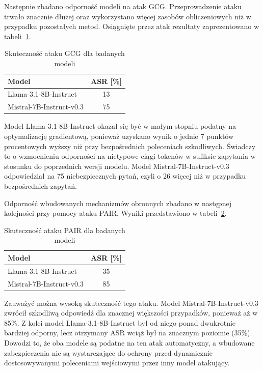 Następnie zbadano odporność modeli na atak \gls{GCG}. Przeprowadzenie ataku trwało znacznie dłużej oraz wykorzystano więcej zasobów obliczeniowych niż w przypadku pozostałych metod. Osiągnięte przez atak rezultaty zaprezentowano w tabeli~\ref{tab:gcg_tab}.
\begin{table}[!ht]
    \centering
    \renewcommand{\arraystretch}{1.2}
    \begin{tabular}{l|c}
        \hline
        \textbf{Model}           & \textbf{ASR [\%]} \\\hline
        Llama-3.1-8B-Instruct    & 13                \\\hline
        Mistral-7B-Instruct-v0.3 & 75                \\\hline
    \end{tabular}
    \caption{\label{tab:gcg_tab}Skuteczność ataku GCG dla badanych modeli}
\end{table}
Model Llama-3.1-8B-Instruct okazał się być w małym stopniu podatny na optymalizację gradientową, ponieważ uzyskano wynik o jednie 7 punktów procentowych wyższy niż przy bezpośrednich poleceniach szkodliwych. Świadczy to o wzmocnieniu odporności na nietypowe ciągi tokenów w sufiksie zapytania w stosunku do poprzednich wersji modelu. Model Mistral-7B-Instruct-v0.3 odpowiedział na 75 niebezpiecznych pytań, czyli o 26 więcej niż w przypadku bezpośrednich zapytań.

Odporność wbudowanych mechanizmów obronnych zbadano w następnej kolejności przy pomocy ataku \gls{PAIR}. Wyniki przedstawiono w tabeli~\ref{tab:pair_tab}.
\begin{table}[!ht]
    \centering
    \renewcommand{\arraystretch}{1.2}
    \begin{tabular}{l|c}
        \hline
        \textbf{Model}           & \textbf{ASR [\%]} \\\hline
        Llama-3.1-8B-Instruct    & 35                \\\hline
        Mistral-7B-Instruct-v0.3 & 85                \\\hline
    \end{tabular}
    \caption{\label{tab:pair_tab}Skuteczność ataku PAIR dla badanych modeli}
\end{table}
Zauważyć można wysoką skuteczność tego ataku. Model Mistral-7B-Instruct-v0.3 zwrócił szkodliwą odpowiedź dla znacznej większości przypadków, ponieważ aż w 85\%. Z kolei model Llama-3.1-8B-Instruct był od niego ponad dwukrotnie bardziej odporny, lecz otrzymany \gls{ASR} wciąż był na znacznym poziomie (35\%). Dowodzi to, że oba modele są podatne na ten atak automatyczny, a wbudowane zabezpieczenia nie są wystarczające do ochrony przed dynamicznie dostosowywanymi poleceniami wejściowymi przez inny model atakujący.

